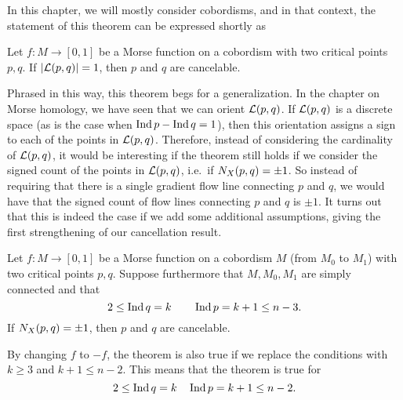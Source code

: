 In this chapter, we will mostly consider cobordisms, and in that context, the statement of this theorem can be expressed shortly as
\begin{theorem}
    Let $f: M \to  [0,1]$ be a Morse function on a cobordism with two critical points $p, q$.
    If $|\mathcal L(p, q)| = 1$, then $p$ and  $q$ are cancelable.
\end{theorem}

Phrased in this way, this theorem begs for a generalization.
In the chapter on Morse homology, we have seen that we can orient $\mathcal L(p, q)$.
If $\mathcal L(p, q)$ is a discrete space (as is the case when  $\operatorname{Ind} p - \operatorname{Ind} q = 1$), then this orientation assigns a sign to each of the points in  $\mathcal L(p, q)$.
Therefore, instead of considering the cardinality of $\mathcal L(p, q)$, it would be interesting if the theorem still holds if we consider the signed count of the points in $\mathcal L(p, q)$, i.e.\ if $N_{X}(p, q) = \pm 1$.
So instead of requiring that there is a single gradient flow line connecting $p$ and  $q$, we would have that the signed count of flow lines connecting  $p$ and  $q$ is  $\pm 1$.
It turns out that this is indeed the case if we add some additional assumptions, giving the first strengthening of our cancellation result.

\begin{theorem}
    Let $f: M \to  [0,1]$ be a Morse function on a cobordism $M$ (from $M_0$ to $M_1$) with two critical points $p, q$.
    Suppose furthermore that $M, M_0, M_1$ are simply connected and that
    \[
    2 \le \operatorname{Ind} q = k  \qquad \operatorname{Ind} p = k+1 \le  n-3
    .\] 
    If $N_{X}(p, q) = \pm 1$, then  $p$ and  $q$ are cancelable.
    \label{thm:cancel-second}
\end{theorem}
\begin{remark}
    By changing $f$ to $-f$, the theorem is also true if we replace the conditions with  $k \ge  3$ and $k + 1 \le  n-2$.
    This means that the theorem is true for 
    \[
    2 \le  \operatorname{Ind} q = k \quad \operatorname{Ind} p = k + 1 \le n-2
    .\] 
\end{remark}

